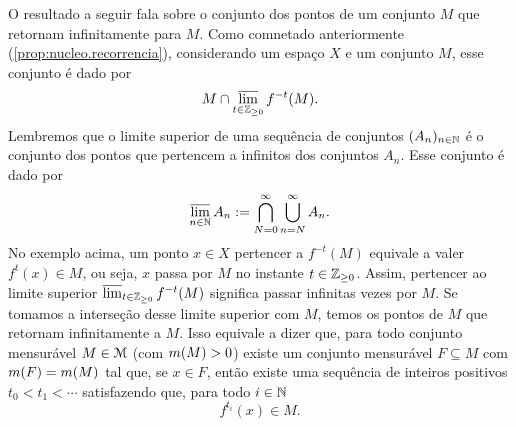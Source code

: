 O resultado a seguir fala sobre o conjunto dos pontos de um conjunto $M$ que retornam infinitamente para $M$. Como comnetado anteriormente (\ref{prop:nucleo.recorrencia}), considerando um espaço $X$ e um conjunto $M$, esse conjunto é dado por
	\begin{equation*}
	M \cap \varlimsup_{t \in \mathbb{Z}_{\geq 0}} f^{-t}(M).
	\end{equation*}
Lembremos que o limite superior de uma sequência de conjuntos $(A_n)_{n \in \mathbb{N}}$ é o conjunto dos pontos que pertencem a infinitos dos conjuntos $A_n$. Esse conjunto é dado por
	\begin{equation*}
	\varlimsup_{n \in \mathbb{N}} A_n := \bigcap_{N=0}^{\infty} \bigcup_{n=N}^{\infty} A_n.
	\end{equation*}
No exemplo acima, um ponto $x \in X$ pertencer a $f^{-t}(M)$ equivale a valer $f^t(x) \in M$, ou seja, $x$ passa por $M$ no instante $t \in \mathbb{Z}_{\geq 0}$. Assim, pertencer ao limite superior $\varlimsup_{t \in \mathbb{Z}_{\geq 0}} f^{-t}(M)$ significa passar infinitas vezes por $M$. Se tomamos a interseção desse limite superior com $M$, temos os pontos de $M$ que retornam infinitamente a $M$. Isso equivale a dizer que, para todo conjunto mensurável $M \in \mathcal{M}$ (com $m(M)>0$) existe um conjunto mensurável $F \subseteq M$ com $m(F)=m(M)$ tal que, se $x \in F$, então existe uma sequência de inteiros positivos $t_0 < t_1 < \cdots$ satisfazendo que, para todo $i \in \mathbb{N}$
	\begin{equation*}
	f^{t_i}(x) \in M.
	\end{equation*}

